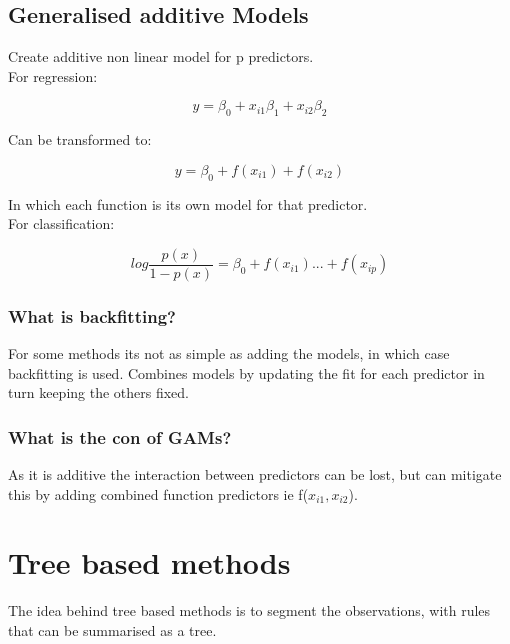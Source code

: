 \documentclass[11pt]{scrartcl} %
\begin{document}
\subsection{Generalised additive Models}

Create additive non linear model for p predictors.\\

For regression:

\begin{equation}
	y = \beta_0 + x_{i1}\beta_1 + x_{i2}\beta_2
\end{equation}

Can be transformed to:

\begin{equation}
	y = \beta_0 + f(x_{i1}) + f(x_{i2})
\end{equation}

In which each function is its own model for that predictor.\\

For classification:

\begin{equation}
	log\frac{p(x)}{1-p(x)} = \beta_0 + f(x_{i1}) ... + f(x_{ip})
\end{equation}

\subsubsection{What is backfitting?}

For some methods its not as simple as adding the models, in which case backfitting is used.
Combines models by updating the fit for each predictor in turn keeping the others fixed.

\subsubsection{What is the con of GAMs?}

As it is additive the interaction between predictors can be lost, but can mitigate this by adding
combined function predictors ie f(\(x_{i1},x_{i2}\)).

\section{Tree based methods}

The idea behind tree based methods is to segment the observations, with rules that can be summarised
as a tree. \\
\end{document}
